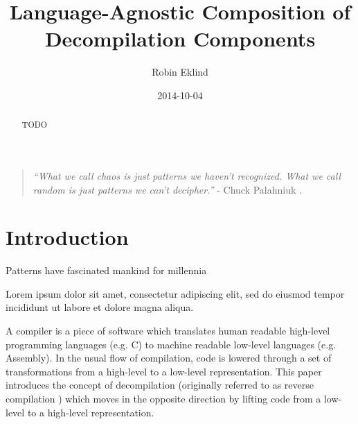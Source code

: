 \documentclass[12pt, a4paper]{article}
\title{Language-Agnostic Composition of Decompilation Components}
\author{Robin Eklind}
\date{2014-10-04}
\begin{document}
\maketitle

\begin{abstract}
TODO
\end{abstract}

\vfill

\begin{quote}
	\textit{``What we call chaos is just patterns we haven't recognized. What we call random is just patterns we can't decipher.''} - Chuck Palahniuk \cite{patterns_quote}.
\end{quote}

\pagebreak




\pagebreak

\tableofcontents

\pagebreak



\section{Introduction}

Patterns have fascinated mankind for millennia

Lorem ipsum dolor sit amet, consectetur adipiscing elit, sed do eiusmod tempor incididunt ut labore et dolore magna aliqua.

A compiler is a piece of software which translates human readable high-level programming languages (e.g. C) to machine readable low-level languages (e.g. Assembly). In the usual flow of compilation, code is lowered through a set of transformations from a high-level to a low-level representation. This paper introduces the concept of decompilation (originally referred to as reverse compilation \cite{rev_comp}) which moves in the opposite direction by lifting code from a low-level to a high-level representation.
\end{document}
